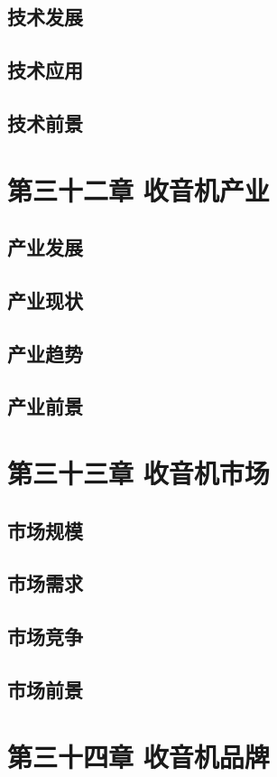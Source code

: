 \documentclass[12pt,UTF8]{ctexbook}
\begin{document}
\section{技术发展}
\section{技术应用}
\section{技术前景}

\chapter{第三十二章 收音机产业}

\section{产业发展}
\section{产业现状}
\section{产业趋势}
\section{产业前景}

\chapter{第三十三章 收音机市场}

\section{市场规模}
\section{市场需求}
\section{市场竞争}
\section{市场前景}

\chapter{第三十四章 收音机品牌}
\end{document}
